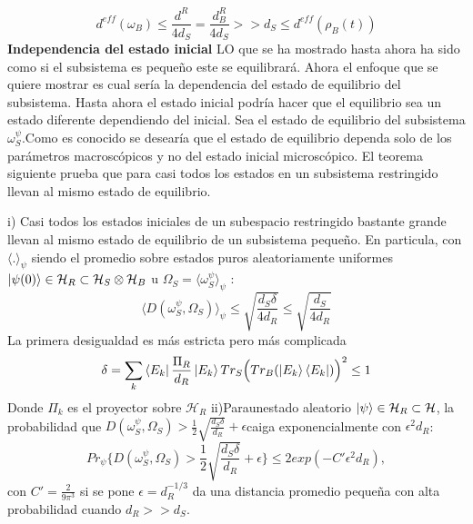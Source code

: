 \begin{equation}
d^{eff}(\omega_{B}) \leq \frac{d^{R}}{4d_{S}}=\frac{d_{B}^{R}}{4d_{S}} >>d_{S} \leq d^{eff}(\rho_{B}(t))
\end{equation}
\textbf{Independencia del estado inicial}
LO que se ha mostrado hasta ahora ha sido como si el subsistema es pequeño este se equilibrará. Ahora el enfoque que se quiere mostrar es cual sería la dependencia del estado de equilibrio del subsistema. Hasta ahora el estado inicial podría hacer que el equilibrio sea un estado diferente dependiendo del inicial. Sea el estado de equilibrio del subsistema $\omega_{S}^{\psi}$.Como es conocido se desearía que el estado de equilibrio dependa solo de los parámetros macroscópicos y no del estado inicial microscópico.
El teorema siguiente prueba que para casi todos los estados en un subsistema restringido llevan al mismo estado de equilibrio.
\begin{theorem}


i) Casi todos los estados iniciales de un subespacio restringido bastante grande llevan al mismo estado de equilibrio de un subsistema pequeño. En particula, con $\langle .\rangle_{\psi}$ siendo el promedio sobre estados puros aleatoriamente uniformes $\ket{\psi(0)} \in \mathcal{H}_{R} \subset \mathcal{H}_{S} \otimes \mathcal{H}_{B}$ u $\Omega_{S}= \langle \omega_{S}^{\psi} \rangle_{\psi}$ :
\begin{equation}
\langle D(\omega_{S}^{\psi}, \Omega_{S}) \rangle_{\psi} \leq \sqrt{\frac{d_{S} \delta}{4d_{R}}} \leq \sqrt{\frac{d_{S}}{4d_{R}}}
\end{equation}
La primera desigualdad es más estricta pero más complicada 
\begin{equation}
\delta= \sum_{k}\bra{E_{k}}\frac{\Pi_{R}}{d_{R}}\ket{E_{k}} Tr_{S} \Big( Tr_{B} (\ket{E_{k}} \bra{E_{k}}) \Big)^{2} \leq  1
\end{equation}
Donde $\Pi_{k}$ es el proyector sobre $\mathcal{H}_{R}$
ii)Paraunestado aleatorio $\ket{\psi} \in \mathcal{H}_{R}\subset \mathcal{H}$, la probabilidad que $D(\omega_{S}^{\psi},\Omega_{S}) > \frac{1}{2} \sqrt{\frac{d_{S} \delta}{d_{R}}}+ \epsilon$caiga exponencialmente con $\epsilon^{2}d_{R}$:
\begin{equation}
Pr_{\psi} \{ D(\omega_{S}^{\psi}, \Omega_{S}) > \frac{1}{2}\sqrt{\frac{d_{S} \delta}{d_{R}}} + \epsilon \} \leq 2exp(-C'\epsilon^{2}d_{R}),
\end{equation}
con $C'=\frac{2}{9 \pi^{3}}$ si se pone $\epsilon=d_{R}^{-1/3}$ da una distancia promedio pequeña con alta probabilidad cuando $d_{R}>>d_{S}$.
\end{theorem}
